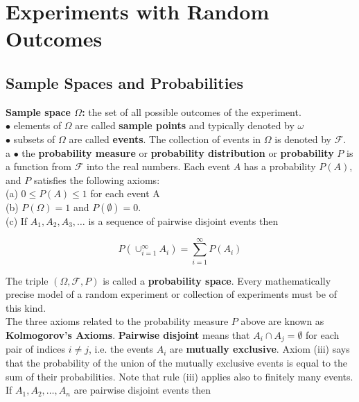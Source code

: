 \section{Experiments with Random Outcomes}

    \subsection{Sample Spaces and Probabilities}            %

        \textbf{Sample space $\Omega$:} the set of all possible outcomes of the experiment. \\
        $\bullet$ elements of $\Omega$ are called \textbf{sample points} and typically denoted by $\omega$ \\
        $\bullet$ subsets of $\Omega$ are called \textbf{events}. The collection of events in $\Omega$ is denoted by $\mathcal{F}$. \\a
        $\bullet$ the \textbf{probability measure} or \textbf{probability distribution} or \textbf{probability} $P$ is a function from $\mathcal{F}$ into the real numbers. Each event $A$ has a probability $P(A)$, and
        $P$ satisfies the following axioms: \\
        (a) $0 \leq P(A) \leq 1$ for each event A \\
        (b) $P(\Omega) = 1$ and $P(\emptyset) = 0$. \\
        (c) If $A_1, A_2, A_3, \dots$ is a sequence of pairwise disjoint events then

        \[
            P\left(\cup_{i=1}^{\infty} A_i\right) = \sum^{\infty}_{i=1} P(A_i)
        \]

        The triple $(\Omega, \mathcal{F}, P)$ is called a \textbf{probability space}. Every mathematically precise model of a random experiment or collection of experiments must be of this kind.  \\

        The three axioms related to the probability measure $P$ above are known as \textbf{Kolmogorov's Axioms}. \textbf{Pairwise disjoint} means that $A_i \cap A_j = \emptyset$ for each pair of indices $i\not = j$, i.e.
        the events $A_i$ are \textbf{mutually exclusive}. Axiom (iii) says that the probability of the union of the mutually exclusive events is equal to the sum of their probabilities. Note that rule (iii) applies also
        to finitely many events. \\

        If $A_1, A_2, \dots, A_n$ are pairwise disjoint events then

